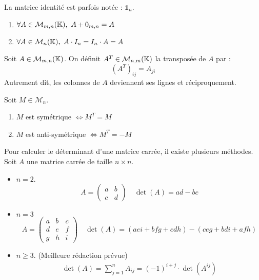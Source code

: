 \begin{remark}
    La matrice identité est parfois notée : $\mathds{1}_n$.
\end{remark}

\begin{lemma}\leavevmode
	\begin{multicols}{2}
	    \begin{enumerate}
    		\item $\forall A \in \mathcal{M}_{m, n}(\K),\ A + 0_{m,n} = A$
    		\item $\forall A \in \mathcal{M}_{n}(\mathbb{K}),\ A \cdot I_n = I_n \cdot A = A$
    	\end{enumerate}
	\end{multicols}
\end{lemma}

\begin{definition}[Transposée]
	Soit $A \in \mathcal{M}_{m, n}(\mathbb{K})$. On définit $A^T \in \mathcal{M}_{n, m}(\mathbb{K})$ la transposée de $A$ par :
	\[(A^T)_{ij} = A_{ji}\]
    Autrement dit, les colonnes de $A$ deviennent ses lignes et réciproquement.
\end{definition}

\begin{definition}
	Soit $M \in \mathcal{M}_n$.
	\begin{multicols}{2}
	    \begin{enumerate}
    		\item $M$ est symétrique $\iff M^T = M$
    		\item $M$ est anti-symétrique $\iff M^T = -M$
    	\end{enumerate}
	\end{multicols}
\end{definition}

\begin{proposition}
    Pour calculer le déterminant d'une matrice carrée, il existe plusieurs méthodes.
    Soit $A$ une matrice carrée de taille $n \times n$. 
    \begin{itemize}
        \item $n = 2$. 
        \[ 
        A = 
        \begin{pmatrix}
            a & b \\
            c & d
        \end{pmatrix}
        \quad 
        \det(A) = ad - bc 
        \]
        \item $n = 3$
        \[
        A = 
        \begin{pmatrix}
            a & b & c \\
            d & e & f \\
            g & h & i
        \end{pmatrix}
        \quad 
        \det(A) = (aei + bfg + cdh) - (ceg + bdi + afh)
        \]
        \item $n \geq 3$.
        (Meilleure rédaction prévue)
        \begin{align*}
            \det(A) = \sum_{j = 1}^{n} A_{ij} = (-1)^{i+j} \cdot \det(A^{ij})
        \end{align*}
    \end{itemize}
\end{proposition}

